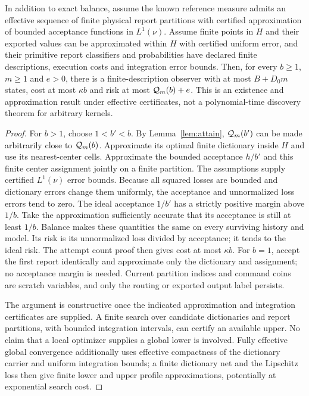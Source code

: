 \begin{proposition}\label{prop:finite}
In addition to exact balance, assume the known reference measure admits an effective sequence of finite physical report partitions with certified approximation of bounded acceptance functions in $L^1(\nu)$. Assume finite points in $H$ and their exported values can be approximated within $H$ with certified uniform error, and their primitive report classifiers and probabilities have declared finite descriptions, execution costs and integration error bounds. Then, for every $b\ge1$, $m\ge1$ and $e>0$, there is a finite-description observer with at most $B+D_0m$ states, cost at most $\kappa b$ and risk at most $\mathcal Q_m(b)+e$. This is an existence and approximation result under effective certificates, not a polynomial-time discovery theorem for arbitrary kernels.
\end{proposition}
\begin{proof}
For $b>1$, choose $1<b'<b$. By Lemma~\ref{lem:attain}, $\mathcal Q_m(b')$ can be made arbitrarily close to $\mathcal Q_m(b)$. Approximate its optimal finite dictionary inside $H$ and use its nearest-center cells. Approximate the bounded acceptance $h/b'$ and this finite center assignment jointly on a finite partition. The assumptions supply certified $L^1(\nu)$ error bounds. Because all squared losses are bounded and dictionary errors change them uniformly, the acceptance and unnormalized loss errors tend to zero. The ideal acceptance $1/b'$ has a strictly positive margin above $1/b$. Take the approximation sufficiently accurate that its acceptance is still at least $1/b$. Balance makes these quantities the same on every surviving history and model. Its risk is its unnormalized loss divided by acceptance; it tends to the ideal risk. The attempt count proof then gives cost at most $\kappa b$. For $b=1$, accept the first report identically and approximate only the dictionary and assignment; no acceptance margin is needed. Current partition indices and command coins are scratch variables, and only the routing or exported output label persists.

The argument is constructive once the indicated approximation and integration certificates are supplied. A finite search over candidate dictionaries and report partitions, with bounded integration intervals, can certify an available upper. No claim that a local optimizer supplies a global lower is involved. Fully effective global convergence additionally uses effective compactness of the dictionary carrier and uniform integration bounds; a finite dictionary net and the Lipschitz loss then give finite lower and upper profile approximations, potentially at exponential search cost.
\end{proof}

